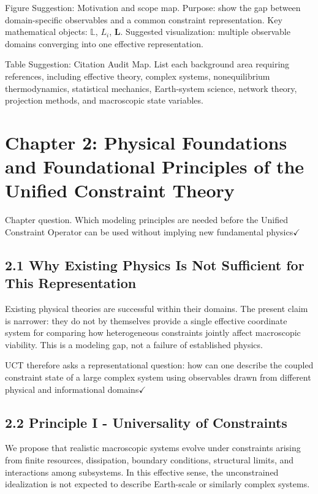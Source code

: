 \documentclass[aps,pre,reprint,superscriptaddress,nofootinbib]{revtex4-2}
\begin{document}
Figure Suggestion: Motivation and scope map. Purpose: show the gap between domain-specific observables and a common constraint representation. Key mathematical objects: \(\mathbb{L}\), \(L_i\), \(\mathbf{L}\). Suggested visualization: multiple observable domains converging into one effective representation.

Table Suggestion: Citation Audit Map. List each background area requiring references, including effective theory, complex systems, nonequilibrium thermodynamics, statistical mechanics, Earth-system science, network theory, projection methods, and macroscopic state variables.

\section{Chapter 2: Physical Foundations and Foundational Principles of the Unified Constraint Theory}

Chapter question. Which modeling principles are needed before the Unified Constraint Operator can be used without implying new fundamental physics$\checkmark$

\subsection{2.1 Why Existing Physics Is Not Sufficient for This Representation}

Existing physical theories are successful within their domains. The present claim is narrower: they do not by themselves provide a single effective coordinate system for comparing how heterogeneous constraints jointly affect macroscopic viability. This is a modeling gap, not a failure of established physics.

UCT therefore asks a representational question: how can one describe the coupled constraint state of a large complex system using observables drawn from different physical and informational domains$\checkmark$

\subsection{2.2 Principle I - Universality of Constraints}

We propose that realistic macroscopic systems evolve under constraints arising from finite resources, dissipation, boundary conditions, structural limits, and interactions among subsystems. In this effective sense, the unconstrained idealization is not expected to describe Earth-scale or similarly complex systems.
\end{document}
